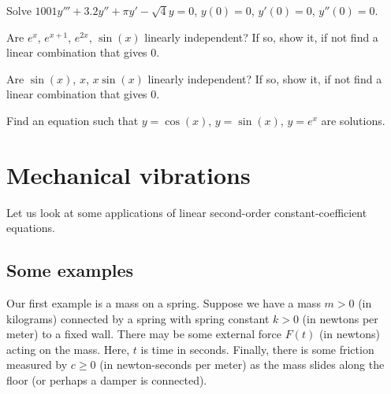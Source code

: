 \begin{exercise}
Solve $1001y'''+3.2y''+\pi y'-\sqrt{4} y = 0$, $y(0)=0$, $y'(0) = 0$,
$y''(0) = 0$.
\end{exercise}

\begin{exercise}
Are $e^{x}$, $e^{x+1}$, $e^{2x}$, $\sin(x)$ linearly independent?
If so, show it, if not find a linear combination that gives $0$.
\end{exercise}

\begin{exercise}
Are $\sin(x)$, $x$, $x\sin(x)$ linearly independent?
If so, show it, if not find a linear combination that gives $0$.
\end{exercise}

\begin{exercise}
Find an equation such that $y=\cos(x)$, $y=\sin(x)$, $y=e^x$ are solutions.
\end{exercise}


\sectionnewpage
\section{Mechanical vibrations} \label{sec:mv}



Let us look at some applications of linear second-order
constant-coefficient equations.

\subsection{Some examples}

\begin{mywrapfigsimp}{2.0in}{2.3in}
\noindent
{}
\end{mywrapfigsimp}
Our first example is a mass on a spring.  Suppose we have a mass $m > 0$
(in kilograms) connected
by a spring with spring constant $k > 0$ (in newtons per meter)
to a fixed wall.  There may be some external
force $F(t)$ (in newtons) acting on the mass.
Here, $t$ is time in seconds.  Finally, there is some
friction measured by $c \geq 0$ (in newton-seconds per meter) as the mass
slides along the floor (or perhaps a damper is connected).

